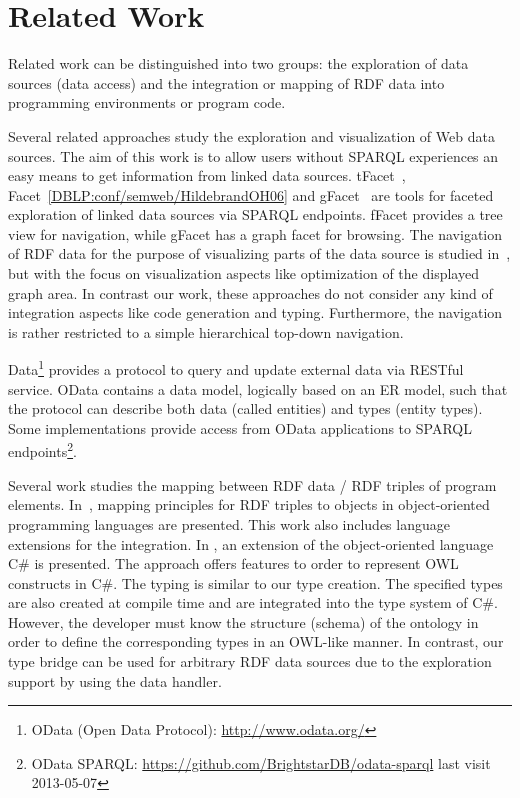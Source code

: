\documentclass{llncs} %
\begin{document}
\section{Related Work}
\label{sec:rw}

Related work can be distinguished into two groups: the exploration of data sources (data access)
and the integration or mapping of RDF data into programming environments or program code.

Several related approaches study the exploration and visualization of Web data sources. 
The aim of this work is to allow users without SPARQL experiences an easy means to
get information from linked data sources.
tFacet~\cite{tFacet}, Facet~\ref{DBLP:conf/semweb/HildebrandOH06} and gFacet~\cite{heim2008gfacet} are tools for faceted exploration of linked data sources
via SPARQL endpoints. fFacet provides a tree view for navigation, while gFacet has a graph facet for browsing.
The navigation of RDF data for the purpose of visualizing parts of the data source is studied in~\cite{DBLP:conf/iv/DokulilK08},
but with the focus on visualization aspects like optimization of the displayed graph area.
In contrast our work, these approaches do not consider any kind of integration aspects like code generation and typing.
Furthermore, the navigation is rather restricted to a simple hierarchical top-down navigation.

Data\footnote{OData (Open Data Protocol): \url{http://www.odata.org/}}  provides a protocol to query and update external data via RESTful service.
OData contains a data model, logically based on an ER model, such that the protocol can describe both data (called entities) and types (entity types).
Some implementations provide access from OData applications to SPARQL endpoints\footnote{OData SPARQL: \url{https://github.com/BrightstarDB/odata-sparql} last visit 2013-05-07}.

Several work studies the mapping between RDF data / RDF triples of program elements.
In~\cite{oren2008}, mapping principles for RDF triples to objects in object-oriented programming languages are presented.
This work also includes language extensions for the integration.
In \cite{PaarV11}, an extension of the object-oriented language C\# is presented.
The approach offers features to order to represent OWL constructs in C\#.
The typing is similar to our type creation.
The specified types are also created at compile time
and are integrated into the type system of C\#. 
However, the developer must know the structure (schema) of the ontology in order
to define the corresponding types in an OWL-like manner. In contrast, our type bridge
can be used for arbitrary RDF data sources due to the exploration support by using the data handler.
\end{document}
